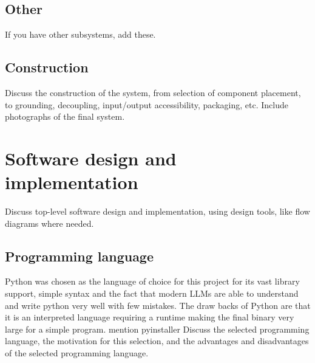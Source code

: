 \documentclass[11pt,a4paper]{article}
\begin{document}
\subsection{Other}

If you have other subsystems, add these.

\subsection{Construction}

Discuss the construction of the system, from selection of component placement, to grounding, decoupling, input/output accessibility, packaging, etc. Include photographs of the final system.



\newpage
\section{Software design and implementation}

Discuss top-level software design and implementation, using design tools, like flow diagrams where needed. 

\subsection{Programming language}

Python was chosen as the language of choice for this  project for its vast library support, simple syntax and the fact that modern LLMs are able to understand and write python very well with few mistakes.  The draw backs of Python are that it is an interpreted language requiring a runtime making the final binary very large for a simple program. 
\newline \newline
mention pyinstaller
 \newline \newline
Discuss the selected programming language, the motivation for this selection, and the advantages and disadvantages of the selected programming language. 

\end{document}
